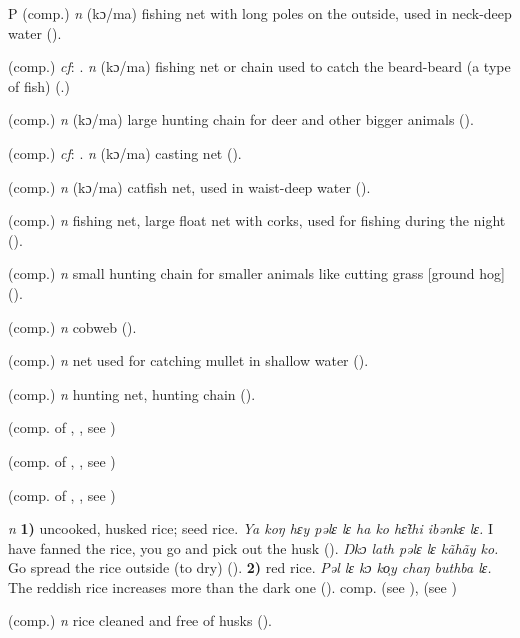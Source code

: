 \begin{letter}{P}
 (comp.) \textit{n} (kɔ/ma) fishing net with long poles on the outside, used in neck-deep water (\citealt{Pichl1967}). 

 (comp.) \textit{cf}: . \textit{n} (kɔ/ma) fishing net or chain used to catch the beard-beard (a type of fish) (\citealt{Pichl1967}.) 

 (comp.) \textit{n} (kɔ/ma) large hunting chain for deer and other bigger animals (\citealt{Pichl1967}). 

 (comp.) \textit{cf}: . \textit{n} (kɔ/ma) casting net (\citealt{Pichl1967}). 

 (comp.) \textit{n} (kɔ/ma) catfish net, used in waist-deep water (\citealt{Pichl1967}). 

 (comp.) \textit{n} fishing net, large float net with corks, used for fishing during the night (\citealt{Pichl1967}). 

 (comp.) \textit{n} small hunting chain for smaller animals like cutting grass [ground hog] (\citealt{Pichl1967}).

 (comp.) \textit{n} cobweb (\citealt{Pichl1967}).

 (comp.) \textit{n} net used for catching mullet in shallow water (\citealt{Pichl1967}). 

 (comp.) \textit{n} hunting net, hunting chain (\citealt{Pichl1967}). 

 (comp. of , , see ) 

 (comp. of , , see ) 

 (comp. of , , see ) 

 \textit{n} \textbf{1)} uncooked, husked rice; seed rice. \textit{Ya koŋ hɛy pəlɛ lɛ ha ko hɛ̃thi ibənkɛ lɛ.} I have fanned the rice, you go and pick out the husk (\citealt{Pichl1967}). \textit{Ŋkɔ lath pəlɛ lɛ kãhãy ko.} Go spread the rice outside (to dry) (\citealt{Pichl1967}). \textbf{2)} red rice. \textit{Pəl lɛ kɔ ko̹y chaŋ buthba lɛ.} The reddish rice increases more than the dark one (\citealt{Pichl1967}). comp.  (see ),  (see ) 

 (comp.) \textit{n} rice cleaned and free of husks (\citealt{Pichl1967}). 


\end{letter}
